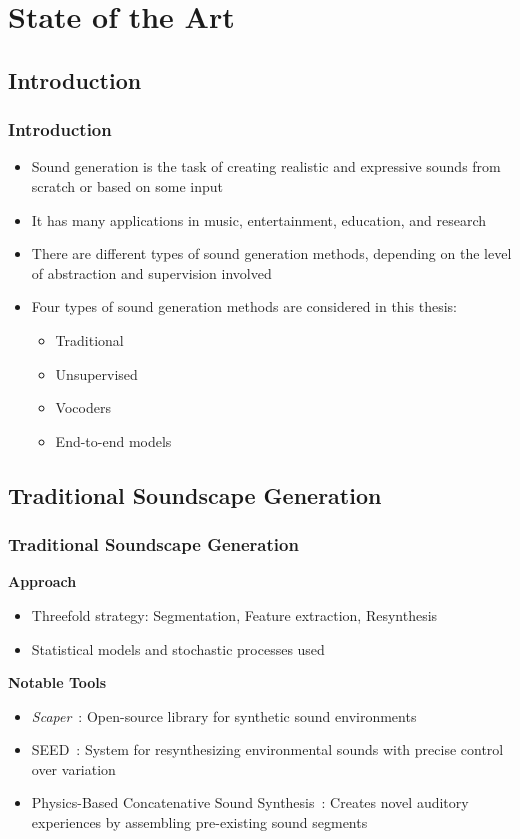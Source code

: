 \section{State of the Art}

\subsection{Introduction}
\begin{frame}
    \frametitle{Introduction}
    \begin{itemize}
        \item Sound generation is the task of creating realistic and expressive sounds from scratch or based on some input
        \item It has many applications in music, entertainment, education, and research
        \item There are different types of sound generation methods, depending on the level of abstraction and supervision involved
        \item Four types of sound generation methods are considered in this thesis:
        \begin{itemize}
            \item Traditional
            \item Unsupervised
            \item Vocoders
            \item End-to-end models
        \end{itemize}
    \end{itemize}
\end{frame}


\subsection{Traditional Soundscape Generation}

\begin{frame}
    \frametitle{Traditional Soundscape Generation}
    
    \textbf{Approach}
    \begin{itemize}
        \item Threefold strategy: Segmentation, Feature extraction, Resynthesis
        \item Statistical models and stochastic processes used
    \end{itemize}

    \textbf{Notable Tools}
    \begin{itemize}
        \item \textit{Scaper}~\cite{salamon_scaper_2017}: Open-source library for synthetic sound environments
        \item SEED~\cite{bernardes_seed_2016}: System for resynthesizing environmental sounds with precise control over variation
        \item Physics-Based Concatenative Sound Synthesis~\cite{magalhaes_physics-based_2020}: Creates novel auditory experiences by assembling pre-existing sound segments
    \end{itemize}
\end{frame}

